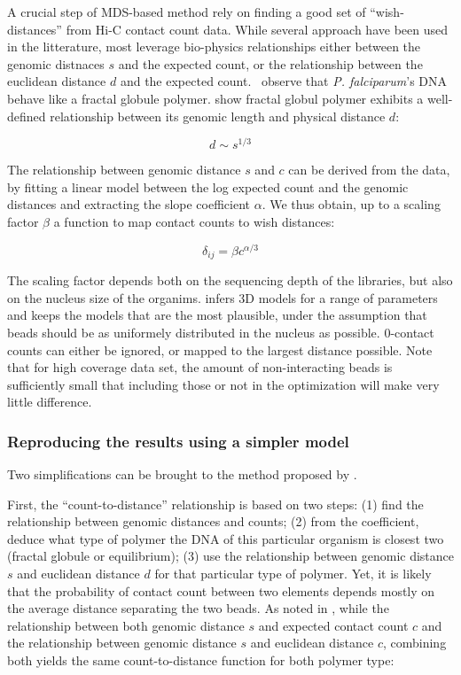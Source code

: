 \documentclass[letterpaper,12pt]{article}
\begin{document}
A crucial step of MDS-based method rely on finding a good set of
``wish-distances'' from Hi-C contact count data. While several approach have
been used in the litterature, most leverage bio-physics relationships either
between the genomic distnaces $s$ and the expected count, or the relationship
between the euclidean distance $d$ and the expected
count. \citet{ay:three-dimensional} observe that {\em P. falciparum}'s DNA
behave like a fractal globule polymer. \citet{grosberg:fractal} show fractal
globul polymer exhibits a well-defined relationship between its genomic length
and physical distance $d$:

$$d\sim s^{1/3}$$

The relationship between genomic distance $s$ and $c$ can be derived from the
data, by fitting a linear model between the log expected count and the genomic
distances and extracting the slope coefficient $\alpha$. We thus obtain, up to
a scaling factor $\beta$ a function to map contact counts to wish distances:

\begin{equation}
\label{eq:count-to-distance}
\delta_{ij} = \beta c^{\alpha/3}
\end{equation}

The scaling factor depends both on the sequencing depth of the libraries, but
also on the nucleus size of the organims. \citet{ay:three-dimensional} infers
3D models for a range of parameters and keeps the models that are the most
plausible, under the assumption that beads should be as uniformely distributed
in the nucleus as possible. 0-contact counts can either be ignored, or mapped
to the largest distance possible. Note that for high coverage data set, the
amount of non-interacting beads is sufficiently small that including those or
not in the optimization will make very little difference.

\subsubsection{Reproducing the results using a simpler model}

Two simplifications can be brought to the method proposed by
\citet{ay:three-dimensional}. 

First, the ``count-to-distance'' relationship is based on two steps: (1) find
the relationship between genomic distances and counts; (2) from the
coefficient, deduce what type of polymer the DNA of this particular organism
is closest two (fractal globule or equilibrium); (3) use the relationship
between genomic distance $s$ and euclidean distance $d$ for that particular
type of polymer. Yet, it is likely that the probability of contact count
between two elements depends mostly on the average distance separating the two
beads. As noted in \citet{varoquaux:statistical}, while the relationship
between both genomic distance $s$ and expected contact count $c$ and the
relationship between genomic distance $s$ and euclidean distance $c$,
combining both yields the same count-to-distance function for both polymer
type:
\end{document}
